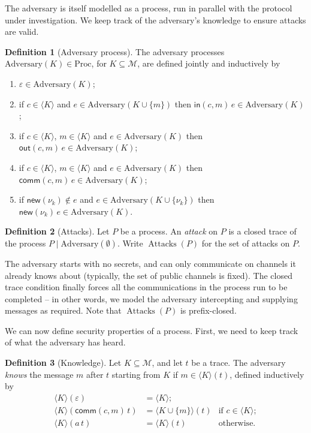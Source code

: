 \documentclass[11pt]{article}
\theoremstyle{definition}
\newtheorem{definition}{Definition}[section]
\theoremstyle{plain}
\theoremstyle{remark}
\newcommand{\Proc}{\mathrm{Proc}}
\newcommand{\Adversary}{\mathrm{Adversary}}
\newcommand{\Attacks}{\operatorname{Attacks}}
\begin{document}
The adversary is itself modelled as a process, run in parallel with the protocol under investigation. We keep track of the adversary's knowledge to ensure attacks are valid.

\begin{definition}[Adversary process]
The adversary processes $\Adversary(K)\in\Proc$, for $K\subseteq\mathcal{M}$, are defined jointly and inductively by
\begin{enumerate}
\item $\varepsilon\in\Adversary(K)$;
\item if $c\in\langle K\rangle$ and $e\in\Adversary(K\cup\{m\})$ then $\mathsf{in}(c,m)\,e\in\Adversary(K)$;
\item if $c\in\langle K\rangle$, $m\in\langle K\rangle$ and $e\in\Adversary(K)$ then $\mathsf{out}(c,m)\,e\in\Adversary(K)$;
\item if $c\in\langle K\rangle$, $m\in\langle K\rangle$ and $e\in\Adversary(K)$ then $\mathsf{comm}(c,m)\,e\in\Adversary(K)$;
\item if $\mathsf{new}(\nu_k)\notin e$ and $e\in\Adversary(K\cup\{\nu_k\})$ then $\mathsf{new}(\nu_k)\,e\in\Adversary(K)$.
\end{enumerate}
\end{definition}

\begin{definition}[Attacks]
Let $P$ be a process. An \textit{attack} on $P$ is a closed trace of the process $P\mid\Adversary(\emptyset)$. Write $\Attacks(P)$ for the set of attacks on $P$.
\end{definition}

The adversary starts with no secrets, and can only communicate on channels it already knows about (typically, the set of public channels is fixed). The closed trace condition finally forces all the communications in the process run to be completed -- in other words, we model the adversary intercepting and supplying messages as required. Note that $\Attacks(P)$ is prefix-closed.

We can now define security properties of a process. First, we need to keep track of what the adversary has heard.

\begin{definition}[Knowledge]
Let $K\subseteq\mathcal{M}$, and let $t$ be a trace. The adversary \textit{knows} the message $m$ after $t$ starting from $K$ if $m\in\langle K\rangle(t)$, defined inductively by
\begin{align*}
\langle K\rangle(\varepsilon)&=\langle K\rangle;\\
\langle K\rangle(\mathsf{comm}(c,m)\,t)&=\langle K\cup\{m\}\rangle(t)&\text{if }c\in\langle K\rangle;\\
\langle K\rangle(a\,t)&=\langle K\rangle(t)&\text{otherwise.}
\end{align*}
\end{definition}
\end{document}
